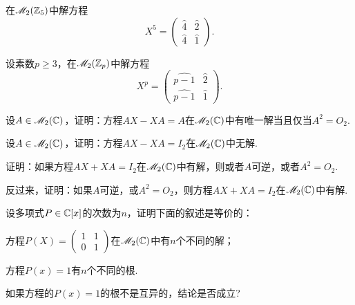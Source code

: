 \begin{mybox}
  \begin{problem}[壮丽的二项式方程.]
    \begin{enum}
      \item \cite{49} 在$\mathscr M_2(\mathbb Z_5)$中解方程
      \[
        X^5 = \begin{pmatrix}
          \hat 4 & \hat 2 \\
          \hat 4 & \hat 1
        \end{pmatrix}.
      \]
      \item 设素数$p\ge3$，在$\mathscr M_2(\mathbb Z_p)$中解方程
      \[
        X^p = \begin{pmatrix}
          \widehat{p-1} & \hat 2 \\
          \widehat{p-1} & \hat 1
        \end{pmatrix}.
      \]
    \end{enum}
  \end{problem}
\end{mybox}

\begin{problem}
  设$A\in\mathscr M_2(\mathbb C)$，证明：方程$AX-XA=A$在$\mathscr M_2(\mathbb C)$中有唯一解当且仅当$A^2=O_2$.
\end{problem}

\begin{problem}
  \begin{enum}
    \item 设$A\in\mathscr M_2(\mathbb C)$，证明：方程$AX-XA=I_2$在$\mathscr M_2(\mathbb C)$中无解.
    \item 证明：如果方程$AX+XA=I_2$在$\mathscr M_2(\mathbb C)$中有解，则或者$A$可逆，或者$A^2=O_2$.

        反过来，证明：如果$A$可逆，或$A^2=O_2$，则方程$AX+XA=I_2$在$\mathscr M_2(\mathbb C)$中有解.
  \end{enum}
\end{problem}

\begin{problem}
  设多项式$P\in\mathbb C[x]$的次数为$n$，证明下面的叙述是等价的：
  \begin{enum}
    \item\label{prob3.96a} 方程$P(X)=\begin{pmatrix}
      1 & 1 \\
      0 & 1
    \end{pmatrix}$在$\mathscr M_2(\mathbb C)$中有$n$个不同的解；
    \item\label{prob3.96b} 方程$P(x)=1$有$n$个不同的根.
  \end{enum}

  如果方程的$P(x)=1$的根不是互异的，结论是否成立?
\end{problem}

